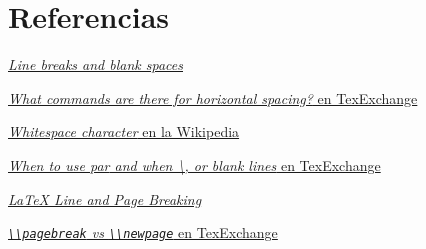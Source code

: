 \section{Referencias}\label{referencias}

\href{https://www.sharelatex.com/learn/Line_breaks_and_blank_spaces}{\emph{Line
breaks and blank spaces}}

\href{http://tex.stackexchange.com/questions/74353/what-commands-are-there-for-horizontal-spacing\#74354}{\emph{What
commands are there for horizontal spacing?} en TexExchange}

\href{https://en.wikipedia.org/wiki/Whitespace_character}{\emph{Whitespace
character} en la Wikipedia}

\href{http://tex.stackexchange.com/questions/82664/when-to-use-par-and-when-or-blank-lines\#82666}{\emph{When to use \emph{par} and when \textbackslash{}, or blank lines} en TexExchange}

\href{http://www.personal.ceu.hu/tex/breaking.htm}{\emph{LaTeX Line and
Page Breaking}}

\href{http://tex.stackexchange.com/questions/736/pagebreak-vs-newpage}{\emph{\lstinline!\\pagebreak! vs \lstinline!\\newpage!} en TexExchange}
